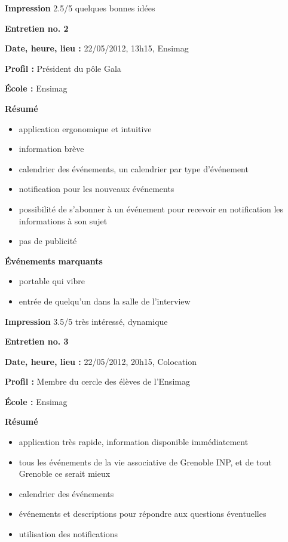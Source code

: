 \documentclass[a4paper, 11px]{article}
\begin{document}
\vspace{.25cm}
\textbf{Impression} 2.5/5 quelques bonnes idées



\vspace{.3cm}

 \textbf {\large Entretien no. 2}

\textbf{Date, heure, lieu : }
22/05/2012, 13h15, Ensimag

\textbf{Profil : }
Président du pôle Gala

\textbf{École : }
Ensimag

\textbf{Résumé}
	\begin{itemize}
		\item application ergonomique et intuitive
		\item information brève
		\item calendrier des événements, un calendrier par type d'événement
		\item notification pour les nouveaux événements
		\item possibilité de s'abonner à un événement pour recevoir en notification les informations à son sujet
		\item pas de publicité
	\end{itemize}

\vspace{.25cm}
\textbf{Événements marquants}
	\begin{itemize}
		\item portable qui vibre
		\item entrée de quelqu'un dans la salle de l'interview
	\end{itemize}

\vspace{.25cm}
\textbf{Impression} 3.5/5 très intéressé, dynamique



\vspace{.3cm}

 \textbf {\large Entretien no. 3}

\textbf{Date, heure, lieu : }
22/05/2012, 20h15, Colocation

\textbf{Profil : }
Membre du cercle des élèves de l'Ensimag

\textbf{École : }
Ensimag

\textbf{Résumé}
	\begin{itemize}
		\item application très rapide, information disponible immédiatement
		\item tous les événements de la vie associative de Grenoble INP, et de tout Grenoble ce serait mieux
		\item calendrier des événements
		\item événements et descriptions pour répondre aux questions éventuelles
		\item utilisation des notifications
	\end{itemize}
\end{document}
